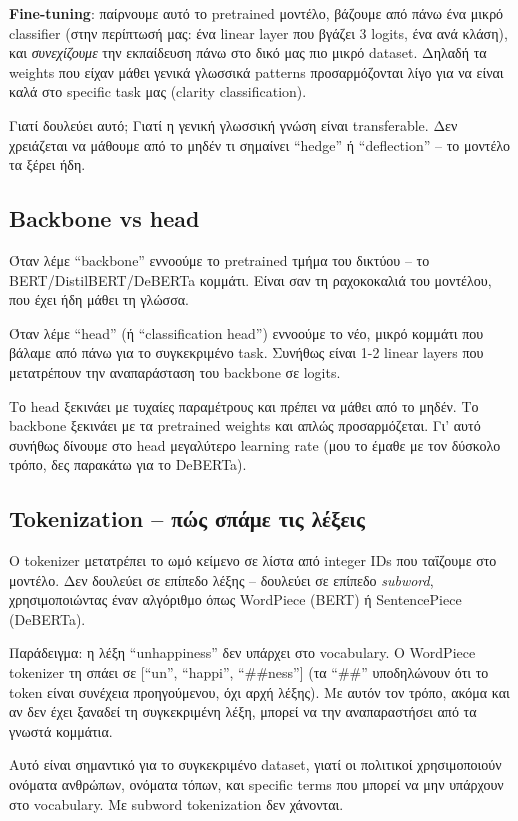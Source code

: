 \documentclass[12pt]{fphw}
\begin{document}
\textbf{Fine-tuning}: παίρνουμε αυτό το pretrained μοντέλο, βάζουμε από πάνω ένα μικρό classifier (στην περίπτωσή μας: ένα linear layer που βγάζει 3 logits, ένα ανά κλάση), και \emph{συνεχίζουμε} την εκπαίδευση πάνω στο δικό μας πιο μικρό dataset. Δηλαδή τα weights που είχαν μάθει γενικά γλωσσικά patterns προσαρμόζονται λίγο για να είναι καλά στο specific task μας (clarity classification).

Γιατί δουλεύει αυτό; Γιατί η γενική γλωσσική γνώση είναι transferable. Δεν χρειάζεται να μάθουμε από το μηδέν τι σημαίνει ``hedge'' ή ``deflection'' -- το μοντέλο τα ξέρει ήδη.

\subsection{Backbone vs head}

Όταν λέμε ``backbone'' εννοούμε το pretrained τμήμα του δικτύου -- το BERT/DistilBERT/DeBERTa κομμάτι. Είναι σαν τη ραχοκοκαλιά του μοντέλου, που έχει ήδη μάθει τη γλώσσα.

Όταν λέμε ``head'' (ή ``classification head'') εννοούμε το νέο, μικρό κομμάτι που βάλαμε από πάνω για το συγκεκριμένο task. Συνήθως είναι 1-2 linear layers που μετατρέπουν την αναπαράσταση του backbone σε logits.

Το head ξεκινάει με τυχαίες παραμέτρους και πρέπει να μάθει από το μηδέν. Το backbone ξεκινάει με τα pretrained weights και απλώς προσαρμόζεται. Γι' αυτό συνήθως δίνουμε στο head μεγαλύτερο learning rate (μου το έμαθε με τον δύσκολο τρόπο, δες παρακάτω για το DeBERTa).

\subsection{Tokenization -- πώς σπάμε τις λέξεις}

Ο tokenizer μετατρέπει το ωμό κείμενο σε λίστα από integer IDs που ταΐζουμε στο μοντέλο. Δεν δουλεύει σε επίπεδο λέξης -- δουλεύει σε επίπεδο \emph{subword}, χρησιμοποιώντας έναν αλγόριθμο όπως WordPiece (BERT) ή SentencePiece (DeBERTa).

Παράδειγμα: η λέξη ``unhappiness'' δεν υπάρχει στο vocabulary. Ο WordPiece tokenizer τη σπάει σε [``un'', ``happi'', ``\#\#ness''] (τα ``\#\#'' υποδηλώνουν ότι το token είναι συνέχεια προηγούμενου, όχι αρχή λέξης). Με αυτόν τον τρόπο, ακόμα και αν δεν έχει ξαναδεί τη συγκεκριμένη λέξη, μπορεί να την αναπαραστήσει από τα γνωστά κομμάτια.

Αυτό είναι σημαντικό για το συγκεκριμένο dataset, γιατί οι πολιτικοί χρησιμοποιούν ονόματα ανθρώπων, ονόματα τόπων, και specific terms που μπορεί να μην υπάρχουν στο vocabulary. Με subword tokenization δεν χάνονται.
\end{document}
